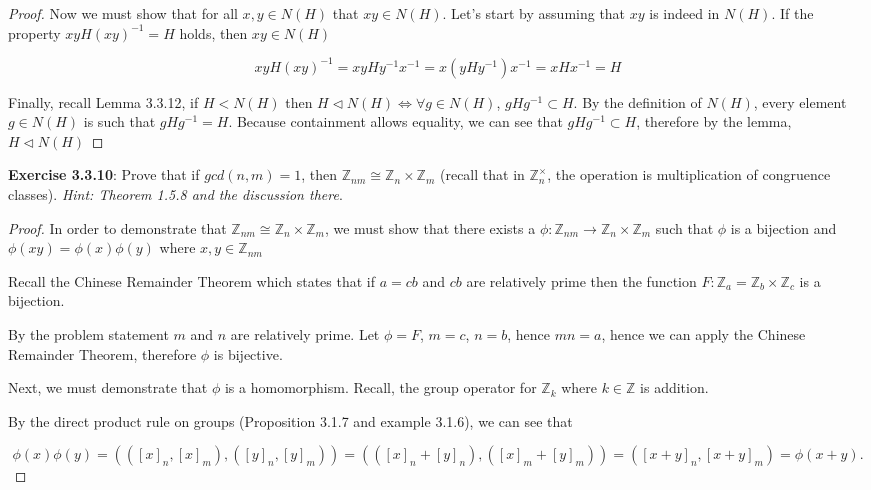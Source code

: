 \documentclass[a4paper]{article}
\begin{document}
\begin{myparindent}{0pt}
\begin{proof}
  Now we must show that for all $x, y \in N(H)$ that $xy \in N(H)$. Let's
  start by assuming that $xy$ is indeed in $N(H)$. If the property
  $x y H (x y)^{-1} = H$ holds, then $xy \in N(H)$

  \[ x y H (x y)^{-1} = xy H y^{-1} x^{-1} = x(y H y^{-1}) x^{-1} = x H x^{-1} = H \]

  Finally, recall Lemma 3.3.12, if $H < N(H)$ then
  $H \triangleleft N(H) \iff \forall g \in N(H)$, $gHg^{-1} \subset H$.
  By the definition of $N(H)$, every element $g \in N(H)$ is such that $gHg^{-1} = H$.
  Because containment allows equality, we can see that $gHg^{-1} \subset H$,
  therefore by the lemma, $H \triangleleft N(H)$
\end{proof}

\textbf{Exercise 3.3.10}:
Prove that if $gcd(n, m) = 1$, then
$\mathbb{Z}_{nm} \cong \mathbb{Z}_n \times \mathbb{Z}_m$
(recall that in $\mathbb{Z}_n^\times$, the operation is multiplication of
congruence classes). \textit{Hint: Theorem 1.5.8 and the discussion there}.
\newline

\begin{proof}
  In order to demonstrate that $\mathbb{Z}_{nm} \cong \mathbb{Z}_n \times \mathbb{Z}_m$,
  we must show that there exists a $\phi: \mathbb{Z}_{nm} \rightarrow \mathbb{Z}_n \times \mathbb{Z}_m$
  such that $\phi$ is a bijection and $\phi(xy) = \phi(x) \phi(y)$ where $x, y \in \mathbb{Z}_{nm}$ \newline

  Recall the Chinese Remainder Theorem which states that if $a = cb$ and $cb$
  are relatively prime then the function $F: \mathbb{Z}_a = \mathbb{Z}_b \times \mathbb{Z}_c$
  is a bijection. \newline

  By the problem statement $m$ and $n$ are relatively prime. Let $\phi = F$, $m = c$, $n = b$,
  hence $mn = a$, hence we can apply the Chinese Remainder Theorem, therefore $\phi$
  is bijective. \newline

  Next, we must demonstrate that $\phi$ is a homomorphism. Recall, the group
  operator for $\mathbb{Z}_k$ where $k \in \mathbb{Z}$ is addition. \newline

  By the direct product rule on groups (Proposition 3.1.7 and example 3.1.6), we
  can see that

  \[ \phi(x) \phi(y) = (([x]_n, [x]_m), ([y]_n, [y]_m)) = (([x]_n + [y]_n), ([x]_m + [y]_m)) = ([x + y]_n, [x + y]_m) = \phi(x + y). \]


\end{proof}
\end{myparindent}
\end{document}
